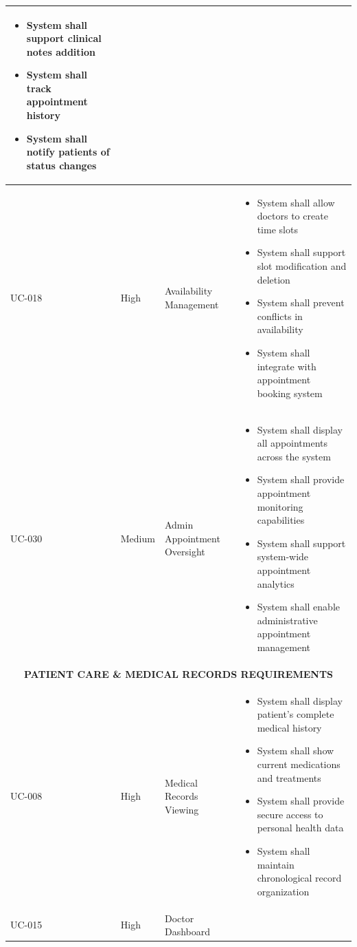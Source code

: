 \documentclass[12pt,a4paper]{article}
\begin{document}
\begin{longtable}{|p{1.2cm}|p{2.5cm}|p{3.5cm}|p{6.8cm}|}
\begin{itemize}[leftmargin=*,topsep=1pt,partopsep=0pt,parsep=0pt,itemsep=1pt]
\item System shall support clinical notes addition
\item System shall track appointment history
\item System shall notify patients of status changes
\end{itemize} \\
\hline
UC-018 & High & Availability Management & 
\begin{itemize}[leftmargin=*,topsep=1pt,partopsep=0pt,parsep=0pt,itemsep=1pt]
\item System shall allow doctors to create time slots
\item System shall support slot modification and deletion
\item System shall prevent conflicts in availability
\item System shall integrate with appointment booking system
\end{itemize} \\
\hline
UC-030 & Medium & Admin Appointment Oversight & 
\begin{itemize}[leftmargin=*,topsep=1pt,partopsep=0pt,parsep=0pt,itemsep=1pt]
\item System shall display all appointments across the system
\item System shall provide appointment monitoring capabilities
\item System shall support system-wide appointment analytics
\item System shall enable administrative appointment management
\end{itemize} \\
\hline
\multicolumn{4}{|c|}{\textbf{PATIENT CARE \& MEDICAL RECORDS REQUIREMENTS}} \\
\hline
UC-008 & High & Medical Records Viewing & 
\begin{itemize}[leftmargin=*,topsep=1pt,partopsep=0pt,parsep=0pt,itemsep=1pt]
\item System shall display patient's complete medical history
\item System shall show current medications and treatments
\item System shall provide secure access to personal health data
\item System shall maintain chronological record organization
\end{itemize} \\
\hline
UC-015 & High & Doctor Dashboard & 
\begin{itemize}[leftmargin=*,topsep=1pt,partopsep=0pt,parsep=0pt,itemsep=1pt]

\end{itemize}
\end{longtable}
\end{document}
